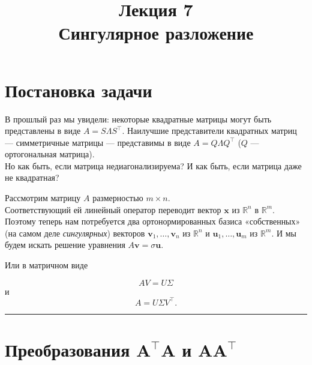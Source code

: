 \documentclass[11pt,a4paper]{article}
\title{Лекция 7 \\
    Сингулярное разложение
    }
\renewcommand{\linethickness}{0.1ex}
\begin{document}
    
\maketitle
\thispagestyle{empty}



    \hypertarget{ux43fux43eux441ux442ux430ux43dux43eux432ux43aux430-ux437ux430ux434ux430ux447ux438}{%
\section{Постановка
задачи}\label{ux43fux43eux441ux442ux430ux43dux43eux432ux43aux430-ux437ux430ux434ux430ux447ux438}}

В прошлый раз мы увидели: некоторые квадратные матрицы могут быть
представлены в виде \(A = S \Lambda S^\top\). Наилучшие представители
квадратных матриц --- симметричные матрицы --- представимы в виде
\(A = Q \Lambda Q^\top\) (\(Q\) --- ортогональная матрица).\\
Но как быть, если матрица недиагонализируема? И как быть, если матрица
даже не квадратная?

Рассмотрим матрицу \(A\) размерностью \(m \times n\).\\
Соответствующий ей линейный оператор переводит вектор \(\mathbf{x}\) из
\(\mathbb{R}^n\) в \(\mathbb{R}^m\). Поэтому теперь нам потребуется два
ортонормированных базиса «собственных» (на самом деле
\emph{сингулярных}) векторов \(\mathbf{v}_1, \ldots, \mathbf{v}_n\) из
\(\mathbb{R}^n\) и \(\mathbf{u}_1, \ldots, \mathbf{u}_m\) из
\(\mathbb{R}^m\). И мы будем искать решение уравнения
\(A\mathbf{v} = \sigma \mathbf{u}\).

Или в матричном виде

\[ A V = U \Sigma \] и \[ A = U \Sigma V^\top. \]

    \begin{center}\rule{0.5\linewidth}{\linethickness}\end{center}

    \hypertarget{ux43fux440ux435ux43eux431ux440ux430ux437ux43eux432ux430ux43dux438ux44f-mathbfatop-a-ux438-mathbfa-atop}{%
\section{\texorpdfstring{Преобразования \(\mathbf{A^\top A}\) и
\(\mathbf{A A^\top}\)}{Преобразования \textbackslash{}mathbf\{A\^{}\textbackslash{}top A\} и \textbackslash{}mathbf\{A A\^{}\textbackslash{}top\}}}\label{ux43fux440ux435ux43eux431ux440ux430ux437ux43eux432ux430ux43dux438ux44f-mathbfatop-a-ux438-mathbfa-atop}}
\end{document}
